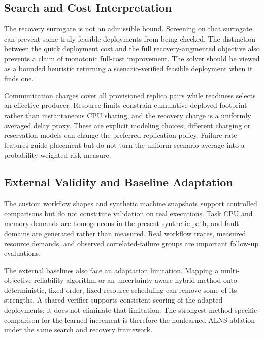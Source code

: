 \subsection{Search and Cost Interpretation}
The recovery surrogate is not an admissible bound. Screening on that
surrogate can prevent some truly feasible deployments from being checked.
The distinction between the quick deployment cost and the full
recovery-augmented objective also prevents a claim of monotonic full-cost
improvement. The solver should be viewed as a bounded heuristic returning
a scenario-verified feasible deployment when it finds one.

Communication charges cover all provisioned replica pairs while readiness
selects an effective producer. Resource limits constrain cumulative deployed
footprint rather than instantaneous CPU sharing, and the recovery charge is
a uniformly averaged delay proxy. These are explicit modeling choices;
different charging or reservation models can change the preferred
replication policy. Failure-rate features guide placement but do not turn
the uniform scenario average into a probability-weighted risk measure.

\subsection{External Validity and Baseline Adaptation}
The custom workflow shapes and synthetic machine snapshots support
controlled comparisons but do not constitute validation on real executions.
Task CPU and memory demands are homogeneous in the present synthetic path,
and fault domains are generated rather than measured. Real workflow traces,
measured resource demands, and observed correlated-failure groups are
important follow-up evaluations.

The external baselines also face an adaptation limitation. Mapping a
multi-objective reliability algorithm or an uncertainty-aware hybrid method
onto deterministic, fixed-order, fixed-resource scheduling can remove some
of its strengths. A shared verifier supports consistent scoring of the
adapted deployments; it does not eliminate that limitation. The strongest
method-specific comparison for the learned increment is therefore the
nonlearned ALNS ablation under the same search and recovery framework.
